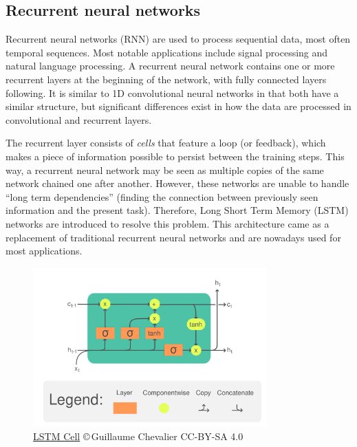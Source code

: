 \subsection{Recurrent neural networks}

Recurrent neural networks (RNN) are used to process sequential data, most often temporal sequences. Most notable applications include signal processing and natural language processing. A recurrent neural network contains one or more recurrent layers at the beginning of the network, with fully connected layers following. It is similar to 1D convolutional neural networks in that both have a similar structure, but significant differences exist in how the data are processed in convolutional and recurrent layers.

The recurrent layer consists of \emph{cells} that feature a loop (or feedback), which makes a piece of information possible to persist between the training steps. This way, a recurrent neural network may be seen as multiple copies of the same network chained one after another. However, these networks are unable to handle ``long term dependencies'' \cite{Bengio1994} (finding the connection between previously seen information and the present task). Therefore, Long Short Term Memory (LSTM) networks are introduced \cite{Hochreiter1997} to resolve this problem. This architecture came as a replacement of traditional recurrent neural networks and are nowadays used for most applications.

\begin{figure}
    \centering
    \includegraphics[width=0.8\textwidth]{slike/Fig02_06.png}
    \caption[LSTM Cell]{\href{https://commons.wikimedia.org/wiki/File:LSTM_Cell.svg}{LSTM Cell} \copyright\,Guillaume Chevalier CC-BY-SA 4.0}
    \label{fig:LSTMCell}
\end{figure}

